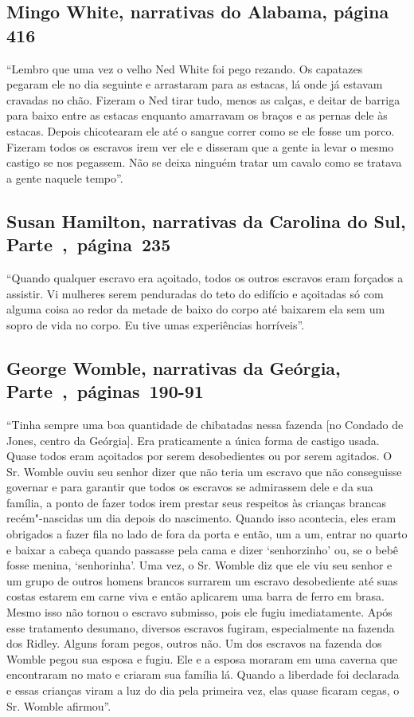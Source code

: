 \subsection{Mingo White, narrativas do Alabama, página 416}
\label{ref285}

``Lembro que uma vez o velho Ned White foi pego rezando. Os capatazes
pegaram ele no dia seguinte e arrastaram para as estacas, lá onde já
estavam cravadas no chão. Fizeram o Ned tirar tudo, menos as calças, e
deitar de barriga para baixo entre as estacas enquanto amarravam os
braços e as pernas dele às estacas. Depois chicotearam ele até o sangue
correr como se ele fosse um porco. Fizeram todos os escravos irem ver
ele e disseram que a gente ia levar o mesmo castigo se nos pegassem. Não
se deixa ninguém tratar um cavalo como se tratava a gente naquele
tempo''.

\subsection{Susan Hamilton, narrativas da Carolina do Sul, Parte~,~página~235}
\label{ref119}

``Quando qualquer escravo era açoitado, todos os outros escravos eram
forçados a assistir. Vi mulheres serem penduradas do teto do edifício e
açoitadas só com alguma coisa ao redor da metade de baixo do corpo até
baixarem ela sem um sopro de vida no corpo. Eu tive umas experiências
horríveis''.

\subsection{George Womble, narrativas da Geórgia, Parte~,~páginas~190-91}
\label{ref308}

``Tinha sempre uma boa quantidade de chibatadas nessa fazenda {[}no
Condado de Jones, centro da Geórgia{]}. Era praticamente a única forma
de castigo usada. Quase todos eram açoitados por serem desobedientes ou
por serem agitados. O Sr. Womble ouviu seu senhor dizer que não teria um
escravo que não conseguisse governar e para garantir que todos os
escravos se admirassem dele e da sua família, a ponto de fazer todos
irem prestar seus respeitos às crianças brancas recém"-nascidas um dia
depois do nascimento. Quando isso acontecia, eles eram obrigados a fazer
fila no lado de fora da porta e então, um a um, entrar no quarto e
baixar a cabeça quando passasse pela cama e dizer `senhorzinho' ou, se o
bebê fosse menina, `senhorinha'. Uma vez, o Sr. Womble diz que ele viu
seu senhor e um grupo de outros homens brancos surrarem um escravo
desobediente até suas costas estarem em carne viva e então aplicarem uma
barra de ferro em brasa. Mesmo isso não tornou o escravo submisso, pois
ele fugiu imediatamente. Após esse tratamento desumano, diversos
escravos fugiram, especialmente na fazenda dos Ridley. Alguns foram
pegos, outros não. Um dos escravos na fazenda dos Womble pegou sua
esposa e fugiu. Ele e a esposa moraram em uma caverna que encontraram no
mato e criaram sua família lá. Quando a liberdade foi declarada e essas
crianças viram a luz do dia pela primeira vez, elas quase ficaram cegas,
o Sr. Womble afirmou''.

